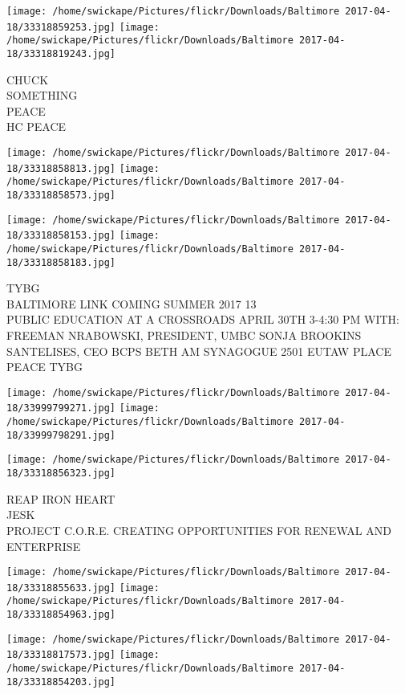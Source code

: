 \documentclass[10pt,letterpaper]{article}
\begin{document}
\texttt{[image: /home/swickape/Pictures/flickr/Downloads/Baltimore 2017-04-18/33318859253.jpg]}
\texttt{[image: /home/swickape/Pictures/flickr/Downloads/Baltimore 2017-04-18/33318819243.jpg]}

CHUCK\\
SOMETHING\\
PEACE\\
HC PEACE\\
\pagebreak

\texttt{[image: /home/swickape/Pictures/flickr/Downloads/Baltimore 2017-04-18/33318858813.jpg]}
\texttt{[image: /home/swickape/Pictures/flickr/Downloads/Baltimore 2017-04-18/33318858573.jpg]}

\texttt{[image: /home/swickape/Pictures/flickr/Downloads/Baltimore 2017-04-18/33318858153.jpg]}
\texttt{[image: /home/swickape/Pictures/flickr/Downloads/Baltimore 2017-04-18/33318858183.jpg]}

TYBG\\
BALTIMORE LINK COMING SUMMER 2017 13\\
PUBLIC EDUCATION AT A CROSSROADS APRIL 30TH 3{-}4:30 PM WITH: FREEMAN NRABOWSKI, PRESIDENT, UMBC SONJA BROOKINS SANTELISES, CEO BCPS BETH AM SYNAGOGUE 2501 EUTAW PLACE\\
PEACE TYBG\\
\pagebreak

\texttt{[image: /home/swickape/Pictures/flickr/Downloads/Baltimore 2017-04-18/33999799271.jpg]}
\texttt{[image: /home/swickape/Pictures/flickr/Downloads/Baltimore 2017-04-18/33999798291.jpg]}

\vspace{0.25in}
\texttt{[image: /home/swickape/Pictures/flickr/Downloads/Baltimore 2017-04-18/33318856323.jpg]}

REAP IRON HEART\\
JESK\\
PROJECT C.O.R.E. CREATING OPPORTUNITIES FOR RENEWAL AND ENTERPRISE\\
\pagebreak

\texttt{[image: /home/swickape/Pictures/flickr/Downloads/Baltimore 2017-04-18/33318855633.jpg]}
\texttt{[image: /home/swickape/Pictures/flickr/Downloads/Baltimore 2017-04-18/33318854963.jpg]}

\texttt{[image: /home/swickape/Pictures/flickr/Downloads/Baltimore 2017-04-18/33318817573.jpg]}
\texttt{[image: /home/swickape/Pictures/flickr/Downloads/Baltimore 2017-04-18/33318854203.jpg]}
\end{document}
